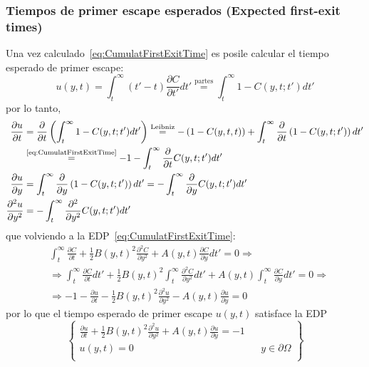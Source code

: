 \subsubsection{Tiempos de primer escape esperados (Expected first-exit times)}\label{sec:ExpectedFirstExitTimes}
Una vez calculado~\eqref{eq:CumulatFirstExitTime} es posile calcular el tiempo esperado de primer escape:
\[
    u(y, t) = \int_t^\infty (t' - t) \frac{\partial C}{\partial t'} dt' \overset{\text{partes}}{=} \int_t^\infty 1 - C(y, t; t') dt'
\]
por lo tanto,
\begin{align*}
    \frac{\partial u}{\partial t}  &= \frac{\partial}{\partial t} \left(\int_t^\infty 1 - C(y, t; t') dt' \right) \overset{\text{Leibniz}}{=} -\left(1-C(y, t, t)\right) + \int_t^\infty \frac{\partial}{\partial t}\left(1 - C(y, t; t')\right) dt' \\
    &\overset{\text{\eqref{eq:CumulatFirstExitTime}}}{=} -1 - \int_t^\infty \frac{\partial}{\partial t} C(y, t; t') dt' \\
    \frac{\partial u}{\partial y}  &= \int_t^\infty \frac{\partial}{\partial y}\left(1 - C(y, t; t')\right) dt' = - \int_t^\infty \frac{\partial}{\partial y} C(y, t; t') dt' \\
    \frac{\partial^2 u}{\partial y^2}  &= - \int_t^\infty \frac{\partial^2}{\partial y^2} C(y, t; t') dt' \\
\end{align*}
que volviendo a la EDP~\eqref{eq:CumulatFirstExitTime}:
\begin{align*}
    &\int_t^\infty\frac{\partial C}{\partial t} + \frac{1}{2} B(y, t)^2 \frac{\partial^2 C}{\partial y^2} + A(y, t) \frac{\partial C}{\partial y} dt' = 0 \Rightarrow \\
    &\Rightarrow \int_t^\infty\frac{\partial C}{\partial t} dt' + \frac{1}{2} B(y, t)^2 \int_t^\infty \frac{\partial^2 C}{\partial y^2} dt' + A(y, t) \int_t^\infty \frac{\partial C}{\partial y} dt' = 0 \Rightarrow \\
    &\Rightarrow -1 - \frac{\partial u}{\partial t} - \frac{1}{2} B(y, t)^2 \frac{\partial^2 u}{\partial y^2} - A(y, t) \frac{\partial u}{\partial y} = 0
\end{align*}
por lo que el tiempo esperado de primer escape $u(y, t)$ satisface la EDP
\[
    \boxed{
        \left\{
        \begin{aligned}
            \frac{\partial u}{\partial t} + \frac{1}{2} B(y, t)^2 \frac{\partial^2 u}{\partial y^2} + A(y, t) \frac{\partial u}{\partial y} = -1\\
            u(y, t) = 0 && y \in \partial\Omega \\
        \end{aligned}
        \right\}
    }
\]
